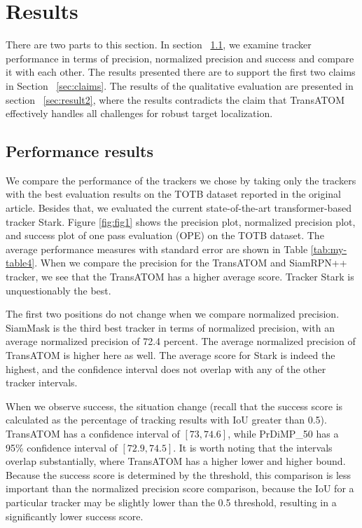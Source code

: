 \section{Results}
\label{sec:results}
There are two parts to this section. In section  ~\ref{sec:result1}, we examine tracker performance in terms of precision, normalized precision and success and compare it with each other. The results presented there are to support the first two claims in Section ~\ref{sec:claims}. The results of the qualitative evaluation are presented in section ~\ref{sec:result2}, where the results contradicts the claim that TransATOM effectively handles all challenges for robust target localization.

\subsection{Performance results}
\label{sec:result1}
We compare the performance of the trackers we chose by taking only the trackers with the best evaluation results on the TOTB dataset reported in the original article. Besides that, we evaluated the current state-of-the-art transformer-based tracker Stark. Figure \ref{fig:fig1} shows the precision plot, normalized precision plot, and success plot of one pass evaluation (OPE) on the TOTB dataset. The average performance measures with standard error are shown in Table \ref{tab:my-table4}. When we compare the precision for the TransATOM and SiamRPN++ tracker, we see that the TransATOM has a higher average score. Tracker Stark is unquestionably the best.

The first two positions do not change when we compare normalized precision. SiamMask is the third best tracker in terms of normalized precision, with an average normalized precision of 72.4 percent. The average normalized precision of TransATOM is higher here as well. The average score for Stark is indeed the highest, and the confidence interval does not overlap with any of the other tracker intervals.

When we observe success, the situation change (recall that the success score is calculated as the percentage of tracking results with IoU greater than 0.5). TransATOM has a confidence interval of $[73, 74.6]$, while PrDiMP\_50 has a 95\% confidence interval of $[72.9, 74.5]$. It is worth noting that the intervals overlap substantially, where TransATOM has a higher lower and higher bound. Because the success score is determined by the threshold, this comparison is less important than the normalized precision score comparison, because the IoU for a particular tracker may be slightly lower than the 0.5 threshold, resulting in a significantly lower success score.

